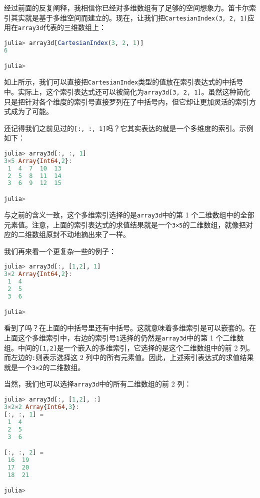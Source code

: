 经过前面的反复阐释，我相信你已经对多维数组有了足够的空间想象力。笛卡尔索引其实就是基于多维空间而建立的。现在，让我们把\verb`CartesianIndex(3, 2, 1)`应用在\verb`array3d`代表的三维数组上：

\begin{lstlisting}[language=julia]
julia> array3d[CartesianIndex(3, 2, 1)]
6

julia>
\end{lstlisting}

如上所示，我们可以直接把\verb`CartesianIndex`类型的值放在索引表达式的中括号中。实际上，这个索引表达式还可以被简化为\verb`array3d[3, 2, 1]`。虽然这种简化只是把针对各个维度的索引号直接罗列在了中括号内，但它却让更加灵活的索引方式成为了可能。

还记得我们之前见过的\verb`[:, :, 1]`吗？它其实表达的就是一个多维度的索引。示例如下：

\begin{lstlisting}[language=julia]
julia> array3d[:, :, 1]
3×5 Array{Int64,2}:
 1  4  7  10  13
 2  5  8  11  14
 3  6  9  12  15

julia> 
\end{lstlisting}

与之前的含义一致，这个多维索引选择的是\verb`array3d`中的第 1 个二维数组中的全部元素值。注意，上面的索引表达式的求值结果就是一个\verb`3×5`的二维数组，就像把对应的二维数组原封不动地摘出来了一样。

我们再来看一个更复杂一些的例子：

\begin{lstlisting}[language=julia]
julia> array3d[:, [1,2], 1]
3×2 Array{Int64,2}:
 1  4
 2  5
 3  6

julia> 
\end{lstlisting}

看到了吗？在上面的中括号里还有中括号。这就意味着多维索引是可以嵌套的。在上面这个多维索引中，右边的索引号\verb`1`选择的仍然是\verb`array3d`中的第 1 个二维数组。中间的\verb`[1,2]`是一个嵌入的多维索引，它选择的是这个二维数组中的前 2 列。而左边的\verb`:`则表示选择这 2 列中的所有元素值。因此，上述索引表达式的求值结果就是一个\verb`3×2`的二维数组。

当然，我们也可以选择\verb`array3d`中的所有二维数组的前 2 列：

\begin{lstlisting}[language=julia]
julia> array3d[:, [1,2], :]
3×2×2 Array{Int64,3}:
[:, :, 1] =
 1  4
 2  5
 3  6

[:, :, 2] =
 16  19
 17  20
 18  21

julia> 
\end{lstlisting}

